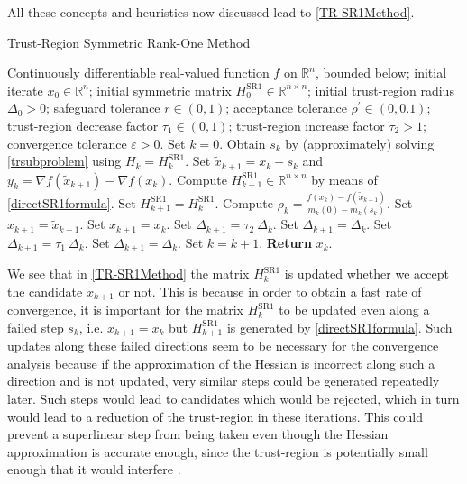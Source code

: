 All these concepts and heuristics now discussed lead to \cref{TR-SR1Method}.
\begin{algorithm}[H]
    \caption{Trust-Region Symmetric Rank-One Method}\label{TR-SR1Method}
    \begin{algorithmic}[1]
        \State Continuously differentiable real-valued function $f$ on $\mathbb{R}^n$, bounded below; initial iterate $x_0 \in \mathbb{R}^n$; initial symmetric matrix $H^{\mathrm{SR1}}_0 \in \mathbb{R}^{n \times n}$; initial trust-region radius $\Delta_0 > 0$; safeguard tolerance $r \in (0,1)$; acceptance tolerance $\rho^{\prime} \in (0, 0.1)$; trust-region decrease factor $\tau_1 \in (0,1)$; trust-region increase factor $\tau_2 > 1$; convergence tolerance $\varepsilon > 0$. Set $k = 0$.
            \State Obtain $s_k$ by (approximately) solving \cref{trsubproblem} using $H_k = H^{\mathrm{SR1}}_k$.
            \State Set $\widetilde{x}_{k+1} = x_k + s_k$ and $y_k = \nabla f(\widetilde{x}_{k+1}) - \nabla f(x_k)$.
                \State Compute $H^{\mathrm{SR1}}_{k+1} \in \mathbb{R}^{n \times n}$ by means of \cref{directSR1formula}. 
			\Else 
				\State Set $H^{\mathrm{SR1}}_{k+1} = H^{\mathrm{SR1}}_k$.
            \EndIf 
            \State Compute $\rho_k = \frac{f(x_k) - f(\widetilde{x}_{k+1})}{m_k(0) - m_k(s_k)}$.
                \State Set $x_{k+1} = \widetilde{x}_{k+1}$.
			\Else 
				\State Set $x_{k+1} = x_k$.
            \EndIf 
                    \State Set $\Delta_{k+1} = \tau_2 \ \Delta_k$.
                \Else 
                    \State Set $\Delta_{k+1} = \Delta_k$.
                \EndIf 
			\Else 
                    \State Set $\Delta_{k+1} = \tau_1 \ \Delta_k$.
                \Else 
                    \State Set $\Delta_{k+1} = \Delta_k$.
                \EndIf 
            \EndIf 
            \State Set $k = k+1$.
        \EndWhile
        \State \textbf{Return} $x_k$.
    \end{algorithmic}
\end{algorithm}
We see that in \cref{TR-SR1Method} the matrix $H^{\mathrm{SR1}}_k$ is updated whether we accept the candidate $\widetilde{x}_{k+1}$ or not. This is because in order to obtain a fast rate of convergence, it is important for the matrix $H^{\mathrm{SR1}}_k$ to be updated even along a failed step $s_k$, i.e. $x_{k+1} = x_k$ but $H^{\mathrm{SR1}}_{k+1}$ is generated by \cref{directSR1formula}. Such updates along these failed directions seem to be necessary for the convergence analysis because if the approximation of the Hessian is incorrect along such a direction and is not updated, very similar steps could be generated repeatedly later. Such steps would lead to candidates which would be rejected, which in turn would lead to a reduction of the trust-region in these iterations. This could prevent a superlinear step from being taken even though the Hessian approximation is accurate enough, since the trust-region is potentially small enough that it would interfere \cite[p.~1028]{ByrdKhalfanSchnabel:1996}. \\
